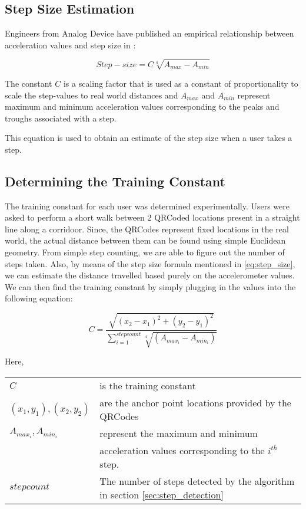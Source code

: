 \subsection{Step Size Estimation}

Engineers from Analog Device have published an empirical relationship between 
acceleration values and step size in \cite{ADXL202}:

\begin{equation}\label{eq:step_size}
 Step-size = C \sqrt[4]{A_{max} - A_{min}}
\end{equation}

The constant $C$ is a scaling factor that is used as a constant of proportionality
to scale the step-values to real world distances and $A_{max}$ and $A_{min}$
represent maximum and minimum acceleration values corresponding to the 
peaks and troughs associated with a step. 

This equation is used to obtain an estimate of the step size when a user 
takes a step.

\subsection{Determining the Training Constant}

The training constant for each user was determined experimentally. 
Users were asked to perform a short walk between 2 QRCoded locations
present in a straight line along a corridoor.
Since, the QRCodes represent fixed locations in the real world, the actual 
distance between them can be found using simple Euclidean geometry. From 
simple step counting, we are able to figure out the number of steps taken.
Also, by means of the step size formula mentioned in \eqref{eq:step_size},
we can estimate the distance travelled based purely on the accelerometer
values. We can then find the training constant by simply plugging in 
the values into the following equation:

\begin{equation}
C=\frac{\sqrt{(x_{2}-x_{1})^{2}+(y_{2}-y_{1})^{2}}}{\sum_{i=1}^{stepcount}\sqrt[4]{(A_{max_{i}}-A_{min_{i}})}}
\end{equation}

Here,\\
\begin{tabular}{l l}
$C$                         & is the training constant   \\
$(x_1, y_1), (x_2, y_2)$    & are the anchor point locations provided by the QRCodes \\
$A_{max_{i}}, A_{min_{i}}$  & represent the maximum and minimum \\
                            & acceleration values corresponding to the $i^{th}$ step.\\
$stepcount$                 & The number of steps detected by the algorithm in section \ref{sec:step_detection} \\
\end{tabular}


